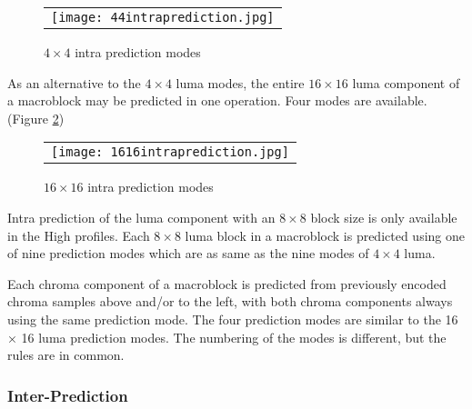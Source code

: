 \documentclass[../main.tex]{subfiles}
\begin{document}
 \begin{figure} [ht]
   \begin{center}
   \begin{tabular}{c} %
   \texttt{[image: 44intraprediction.jpg]}
   \end{tabular}
   \end{center}
   \caption[predmodes] 
   { \label{fig:4x4predmodes} 
$4 \times 4$ intra prediction modes \cite{richardson2004h} }
   \end{figure}     %
   
As an alternative to the $4 \times 4$ luma modes, the entire $16 \times 16$ luma component
of a macroblock may be predicted in one operation. Four modes are available.(Figure \ref{fig:16x16predmodes})

\begin{figure} [ht]
   \begin{center}
   \begin{tabular}{c} %
   \texttt{[image: 1616intraprediction.jpg]}
   \end{tabular}
   \end{center}
   \caption[16x16predmodes] 
   { \label{fig:16x16predmodes} 
$16 \times 16$ intra prediction modes \cite{richardson2004h} }
   \end{figure}     %
   
Intra prediction of the luma component with an $8 \times 8$ block size is only available in the High
profiles. Each $8 \times 8$ luma block in a macroblock is predicted using one of nine
prediction modes which are as same as the nine modes of $4 \times 4$ luma.
   
Each chroma component of a macroblock is predicted from previously encoded chroma
samples above and/or to the left, with both chroma components always using the same
prediction mode. The four prediction modes are similar to the 16 × 16 luma prediction
modes. The numbering of the modes is different, but the rules are in common.
  
\subsubsection{ Inter-Prediction }
\end{document}
